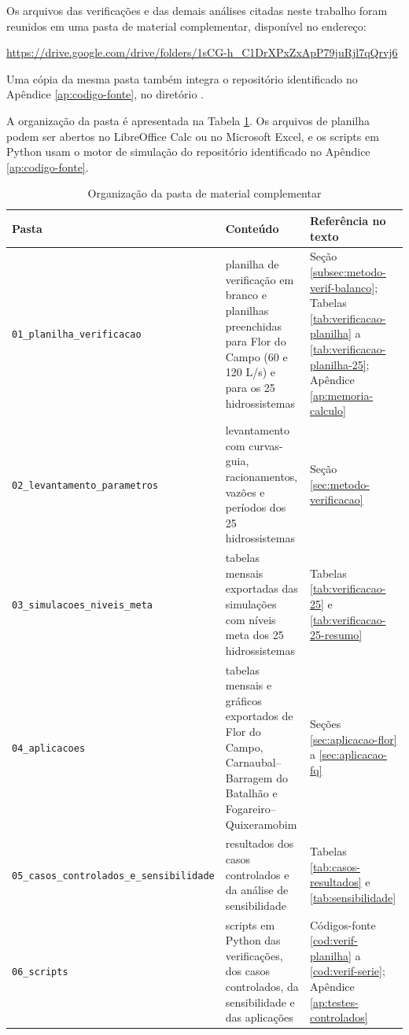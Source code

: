 \label{ap:material-complementar}

Os arquivos das verificações e das demais análises citadas neste trabalho foram reunidos em uma pasta de material complementar, disponível no endereço:

\begin{center}
\url{https://drive.google.com/drive/folders/1sCG-h_C1DrXPxZxApP79juRjl7qQrvj6}
\end{center}

Uma cópia da mesma pasta também integra o repositório identificado no Apêndice \ref{ap:codigo-fonte}, no diretório .

A organização da pasta é apresentada na Tabela \ref{tab:material-complementar}. Os arquivos de planilha podem ser abertos no LibreOffice Calc ou no Microsoft Excel, e os scripts em Python usam o motor de simulação do repositório identificado no Apêndice \ref{ap:codigo-fonte}.

\begin{table}[!htbp]
    \captionsetup{width=15cm}
    \caption{Organização da pasta de material complementar}
    \label{tab:material-complementar}
    \centering
    \footnotesize
    \begin{tabular}{p{5.4cm}p{6.0cm}p{2.8cm}}
        \toprule
        Pasta & Conteúdo & Referência no texto \\
        \midrule
        \texttt{01\_planilha\_verificacao} & planilha de verificação em branco e planilhas preenchidas para Flor do Campo (60 e 120 L/s) e para os 25 hidrossistemas & Seção \ref{subsec:metodo-verif-balanco}; Tabelas \ref{tab:verificacao-planilha} a \ref{tab:verificacao-planilha-25}; Apêndice \ref{ap:memoria-calculo} \\
        \texttt{02\_levantamento\_parametros} & levantamento com curvas-guia, racionamentos, vazões e períodos dos 25 hidrossistemas & Seção \ref{sec:metodo-verificacao} \\
        \texttt{03\_simulacoes\_niveis\_meta} & tabelas mensais exportadas das simulações com níveis meta dos 25 hidrossistemas & Tabelas \ref{tab:verificacao-25} e \ref{tab:verificacao-25-resumo} \\
        \texttt{04\_aplicacoes} & tabelas mensais e gráficos exportados de Flor do Campo, Carnaubal--Barragem do Batalhão e Fogareiro--Quixeramobim & Seções \ref{sec:aplicacao-flor} a \ref{sec:aplicacao-fq} \\
        \texttt{05\_casos\_controlados\_}\newline\texttt{e\_sensibilidade} & resultados dos casos controlados e da análise de sensibilidade & Tabelas \ref{tab:casos-resultados} e \ref{tab:sensibilidade} \\
        \texttt{06\_scripts} & scripts em Python das verificações, dos casos controlados, da sensibilidade e das aplicações & Códigos-fonte \ref{cod:verif-planilha} a \ref{cod:verif-serie}; Apêndice \ref{ap:testes-controlados} \\
        \bottomrule
    \end{tabular}
\end{table}
